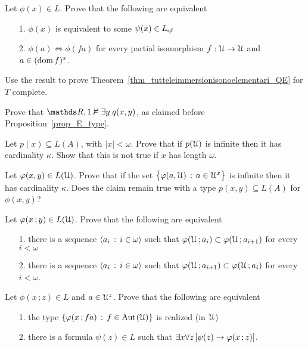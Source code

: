 \begin{exercise}\label{ex_qe_in_U}
  Let $\phi(x)\in L$. Prove that the following are equivalent
  \begin{itemize}
   \item[1.] $\phi(x)$ is equivalent to some $\psi(x)\in L_{\rm qf}$
   \item[2.] $\phi(a)\iff\phi(fa)$ for every partial isomorphism $f:\EuScript U\to\EuScript U$ and $a\in(\mathop{\rm dom} f)^x$.
  \end{itemize}
  Use the result to prove Theorem~\ref{thm_tutteleimmersionisonoelementari_QE} for $T$ complete.
  \end{exercise}

\begin{exercise}\label{ex_E_type}
Prove that $\RR,1\notmodels\E y\;q(x,y)$, as claimed before Proposition~\ref{prop_E_type}.
\end{exercise}

\begin{exercise}\label{cadinalitafinitasaturazione}
Let $p(x)\subseteq L(A)$, with $|x|<\omega$. 
Prove that if $p(\EuScript U)$ is infinite then it has cardinality $\kappa$. 
Show that this is not true if $x$ has length $\omega$. 
\end{exercise}

\begin{exercise}\label{cadinalitafinitasaturazioneinsiemi}
Let $\varphi(x,y)\in L(\EuScript U)$. Prove that if the set $\big\{\varphi(a,\EuScript U)\, :\, a\in\EuScript U^{x}\big\}$ is infinite then it has cardinality $\kappa$.
Does the claim remain true with a type $p(x,y)\subseteq L(A)$ for $\phi(x,y)$? 
\end{exercise}

\begin{exercise}\label{ex_saturazione_catene_insiemi}
Let $\varphi(x\,;y)\in L(\EuScript U)$. Prove that the following are equivalent
\begin{itemize}
\item[1.] there is a sequence $\langle a_i\,:\,i\in\omega\rangle$ such that $\varphi(\EuScript U\,;a_i)\subset\varphi(\EuScript U\,;a_{i+1})$ for every $i<\omega$
\item[2.] there is a sequence $\langle a_i\,:\,i\in\omega\rangle$ such that $\varphi(\EuScript U\,;a_{i+1})\subset\varphi(\EuScript U\,;a_i)$ for every $i<\omega$.
\end{itemize}
\end{exercise}

\begin{exercise}\label{ex_ak_definibilita}
  Let $\phi(x\,;z)\in L$ and $a\in\EuScript U^z$.
  Prove that the following are equivalent
  \begin{itemize}
    \item[1.] the type $\{\varphi(x\,;fa)\,:\,f\in{\rm Aut\kern.15ex}(\EuScript U)\}$ is realized (in $\EuScript U$)
    \item[2.] there is a formula $\psi(z)\in L$ such that $\exists x\forall z\,[\psi(z)\rightarrow\varphi(x\,;z)]$.
  \end{itemize}  
\end{exercise}


